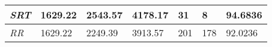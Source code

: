 \documentclass{article}
\begin{document}
\begin{table}[h!]
\begin{tabular}{|l|l|l|l|l|l|l|}
  \textit{SRT}       & 1629.22                                                                          & 2543.57                                                                     & 4178.17                                                                            & 31                                                                                    & 8                                                                                   & 94.6836                                                                    \\ \hline
  \textit{RR}        & 1629.22                                                                          & 2249.39                                                                     & 3913.57                                                                            & 201                                                                                   & 178                                                                                 & 92.0236                                                                    \\ \hline
  \end{tabular}
  \label{table:6}
\end{table}
\end{document}

